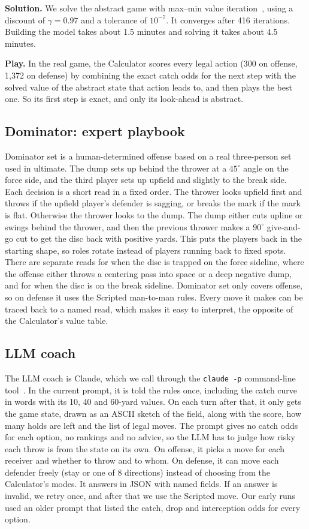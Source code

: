 \documentclass[conference]{IEEEtran}
\begin{document}
\textbf{Solution.} We solve the abstract game with max--min value iteration~\cite{condon1992,baier2008}, using a discount of $\gamma=0.97$ and a tolerance of $10^{-7}$. It converges after 416 iterations. Building the model takes about 1.5 minutes and solving it takes about 4.5 minutes.

\textbf{Play.} In the real game, the Calculator scores every legal action (300 on offense, 1,372 on defense) by combining the exact catch odds for the next step with the solved value of the abstract state that action leads to, and then plays the best one. So its first step is exact, and only its look-ahead is abstract.

\subsection{Dominator: expert playbook}
Dominator set is a human-determined offense based on a real three-person set used in ultimate. The dump sets up behind the thrower at a $45^\circ$ angle on the force side, and the third player sets up upfield and slightly to the break side. Each decision is a short read in a fixed order. The thrower looks upfield first and throws if the upfield player's defender is sagging, or breaks the mark if the mark is flat. Otherwise the thrower looks to the dump. The dump either cuts upline or swings behind the thrower, and then the previous thrower makes a $90^\circ$ give-and-go cut to get the disc back with positive yards. This puts the players back in the starting shape, so roles rotate instead of players running back to fixed spots. There are separate reads for when the disc is trapped on the force sideline, where the offense either throws a centering pass into space or a deep negative dump, and for when the disc is on the break sideline. Dominator set only covers offense, so on defense it uses the Scripted man-to-man rules. Every move it makes can be traced back to a named read, which makes it easy to interpret, the opposite of the Calculator's value table.

\subsection{LLM coach}
The LLM coach is Claude, which we call through the \texttt{claude -p} command-line tool~\cite{claude}. In the current prompt, it is told the rules once, including the catch curve in words with its 10, 40 and 60-yard values. On each turn after that, it only gets the game state, drawn as an ASCII sketch of the field, along with the score, how many holds are left and the list of legal moves. The prompt gives no catch odds for each option, no rankings and no advice, so the LLM has to judge how risky each throw is from the state on its own. On offense, it picks a move for each receiver and whether to throw and to whom. On defense, it can move each defender freely (stay or one of 8 directions) instead of choosing from the Calculator's modes. It answers in JSON with named fields. If an answer is invalid, we retry once, and after that we use the Scripted move. Our early runs used an older prompt that listed the catch, drop and interception odds for every option.
\end{document}
